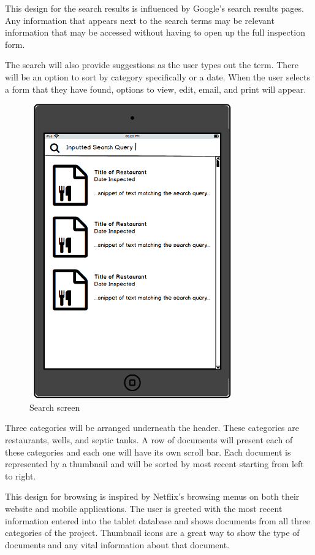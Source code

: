 \documentclass[twoside,letterpaper]{article}
\begin{document}
{\noindent This design for the search results is influenced by Google's search results pages. Any information that appears next to the search terms may be relevant information that may be accessed without having to open up the full inspection form.
\newline

\noindent The search will also provide suggestions as the user types out the term. There will be an option to sort by category specifically or a date. When the user selects a form that they have found, options to view, edit, email, and print will appear.
\newline

\begin{figure}[h]
\centering
\includegraphics[width=3.5in,height=5in]{Search.png}
\caption{Search screen}
\end{figure}
\newpage
\noindent Three categories will be arranged underneath the header. These categories are restaurants, wells, and septic tanks. A row of documents will present each of these categories and each one will have its own scroll bar. Each document is represented by a thumbnail and will be sorted by most recent starting from left to right.
\newline

\noindent This design for browsing is inspired by Netflix's browsing menus on both their website and mobile applications. The user is greeted with the most recent information entered into the tablet database and shows documents from all three categories of the project. Thumbnail icons are a great way to show the type of documents and any vital information about that document.
\newline

}
\end{document}

